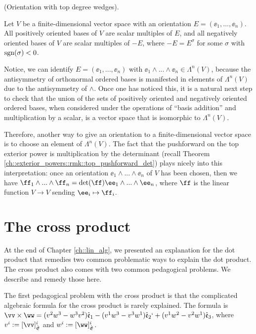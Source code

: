 \begin{theorem}
\label{ch::exterior_powers::defn::orientation_with_top_degree_wedges}
    (Orientation with top degree wedges).
    
    Let $V$ be a finite-dimensional vector space with an orientation $E = (\ee_1, ..., \ee_n)$. All positively oriented bases of $V$ are scalar multiples of $E$, and all negatively oriented bases of $V$ are scalar multiples of $-E$, where $-E = E^\sigma$ for some $\sigma$ with $\text{sgn}(\sigma) < 0$.
    
    Notice, we can identify $E = (\ee_1, ..., \ee_n)$ with $\ee_1 \wedge ... \wedge \ee_n \in \Lambda^n(V)$, because the antisymmetry of orthonormal ordered bases is manifested in elements of $\Lambda^n(V)$ due to the antisymmetry of $\wedge$. Once one has noticed this, it is a natural next step to check that the union of the sets of positively oriented and negatively oriented ordered bases, when considered under the operations of ``basis addition'' and multiplication by a scalar, is a vector space that is isomorphic to $\Lambda^n(V)$.
    
    Therefore, another way to give an orientation to a finite-dimensional vector space is to choose an element of $\Lambda^n(V)$. The fact that the pushforward on the top exterior power is multiplication by the determinant (recall Theorem \ref{ch::exterior_powers::rmk::top_pushforward_det}) plays nicely into this interpretation: once an orientation $\ee_1 \wedge ... \wedge \ee_n$ of $V$ has been chosen, then we have $\ff_1 \wedge ... \wedge \ff_n = \det(\ff) \ee_1 \wedge ... \wedge \ee_n$, where $\ff$ is the linear function $V \rightarrow V$ sending $\ee_i \mapsto \ff_i$.
\end{theorem}

\section{The cross product}
\label{ch::exterior_powers::section::cross_product}

At the end of Chapter \ref{ch::lin_alg}, we presented an explanation for the dot product that remedies two common problematic ways to explain the dot product. The cross product also comes with two common pedagogical problems. We describe and remedy those here.

The first pedagogical problem with the cross product is that the complicated algebraic formula for the cross product is rarely explained. The formula is $\vv \times \ww = (v^2 w^3 - w^3 v^2) \see_1 - (v^1 w^3 - v^3 w^1) \see_2`+ (v^1 w^2 - v^2 w^1) \see_3$, where $v^i := [\vv]_\sE^i$ and $w^i := [\ww]_\sE^i$.

